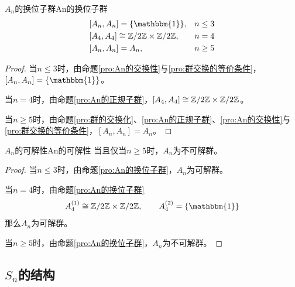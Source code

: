 \begin{proposition}{$A_n$的换位子群}{An的换位子群}
	\begin{align*}
		& [A_n,A_n] = \{\mathbbm{1}\}, && n \leq 3\\
		& [A_4,A_4] \cong \Z/2\Z \times \Z/2\Z, && n = 4\\
		& [A_n,A_n] = A_n, && n \geq 5
	\end{align*}
\end{proposition}

\begin{proof}
	当$n\le 3$时，由命题\ref{pro:An的交换性}与\ref{pro:群交换的等价条件}，$[A_n,A_n] = \{\mathbbm{1}\}$。
	
	当$n=4$时，由命题\ref{pro:An的正规子群}，$[A_4,A_4] \cong \mathbb{Z}/2\mathbb{Z} \times \mathbb{Z}/2\mathbb{Z}$。
	
	当$n\ge 5$时，由命题\ref{pro:群的交换化}、\ref{pro:An的正规子群}、\ref{pro:An的交换性}与\ref{pro:群交换的等价条件}，$[A_n,A_n] = A_n$。
\end{proof}

\begin{proposition}{$A_n$的可解性}{An的可解性}
	当且仅当$n\ge 5$时，$A_n$为不可解群。
\end{proposition}

\begin{proof}
	当$n\le 3$时，由命题\ref{pro:An的换位子群}，$A_n$为可解群。
	
	当$n=4$时，由命题\ref{pro:An的换位子群}
	$$
	A_4^{(1)}\cong \Z/2\Z \times \Z/2\Z,\qquad 
	A_4^{(2)}= \{\mathbbm{1}\}
	$$
	那么$A_n$为可解群。
	
	当$n\ge 5$时，由命题\ref{pro:An的换位子群}，$A_n$为不可解群。
\end{proof}

\subsection{$S_n$的结构}

